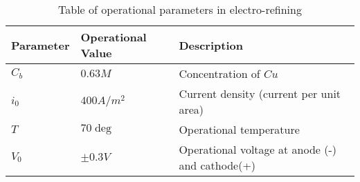 \begin{table}[]
\begin{tabular}{lll}
Parameter & Operational Value & Description                             \\\hline
$C_b$     & $0.63M$           & Concentration of $Cu$                   \\
$i_0$     & $400 A/m^2$       & Current density (current per unit area) \\
$T$       & $70\deg$          & Operational temperature             \\
$V_0$       & $\pm0.3V$          & Operational voltage at anode (-) and cathode(+)             \\\hline   
\end{tabular}
\caption{Table of operational parameters in electro-refining \cite{schlesinger}}
\end{table}